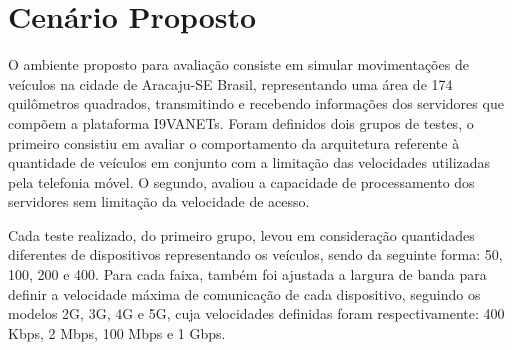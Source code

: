 \documentclass[
	12pt,				%
	oneside,			%
	a4paper,			%
	english,			%
	brazil				%
	]{abntex2ppgsi}
\begin{document}

\section{Cenário Proposto}

O ambiente proposto para avaliação consiste em simular movimentações de veículos na cidade de Aracaju-SE Brasil, representando uma área de 174 quilômetros quadrados, transmitindo e recebendo informações dos servidores que compõem a plataforma I9VANETs. Foram definidos dois grupos de testes, o primeiro consistiu em avaliar o comportamento da arquitetura referente à quantidade de veículos em conjunto com a limitação das velocidades utilizadas pela telefonia móvel. O segundo, avaliou a capacidade de processamento dos servidores sem limitação da velocidade de acesso.



Cada teste realizado, do primeiro grupo, levou em consideração quantidades diferentes de dispositivos representando os veículos, sendo da seguinte forma: 50, 100, 200 e 400. Para cada faixa, também foi ajustada a largura de banda para definir a velocidade máxima de comunicação de cada dispositivo, seguindo os modelos 2G, 3G, 4G e 5G, cuja velocidades definidas foram respectivamente: 400 Kbps, 2 Mbps, 100 Mbps e 1 Gbps.
\end{document}
